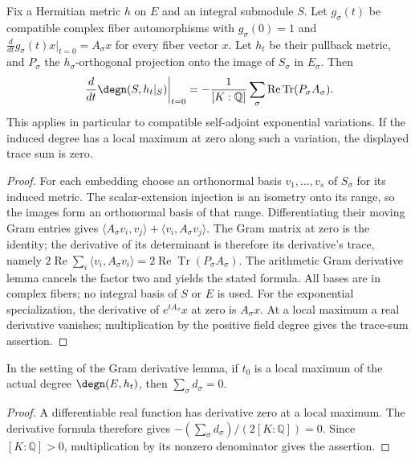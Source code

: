 \begin{lemma}
\label{lem:submodule-projection-trace-derivative}
\leanok
Fix a Hermitian metric $h$ on $E$ and an integral submodule $S$.
Let $g_\sigma(t)$ be compatible complex fiber automorphisms with
$g_\sigma(0)=1$ and
$\frac{d}{dt}g_\sigma(t)x|_{t=0}=A_\sigma x$ for every fiber vector $x$.
Let $h_t$ be their pullback metric, and $P_\sigma$ the $h_\sigma$-orthogonal
projection onto the image of $S_\sigma$ in $E_\sigma$. Then
\[
 \left.\frac{d}{dt}\degn(S,h_t|_S)\right|_{t=0}
 =-\frac1{[K:\mathbb Q]}\sum_\sigma
   \operatorname{Re}\operatorname{Tr}(P_\sigma A_\sigma).
\]
This applies in particular to compatible self-adjoint exponential
variations. If the induced degree has a local maximum at zero along
such a variation, the displayed trace sum is zero.
\end{lemma}
\begin{proof}
For each embedding choose an orthonormal basis $v_1,\ldots,v_s$ of
$S_\sigma$ for its induced metric. The scalar-extension injection
is an isometry onto its range, so the images form an orthonormal basis
of that range. Differentiating their moving Gram entries gives
$\langle A_\sigma v_i,v_j\rangle+\langle v_i,A_\sigma v_j\rangle$.
The Gram matrix at zero is the identity; the derivative of its
determinant is therefore its derivative's trace, namely
$2\operatorname{Re}\sum_i\langle v_i,A_\sigma v_i\rangle
=2\operatorname{Re}\operatorname{Tr}(P_\sigma A_\sigma)$.
The arithmetic Gram derivative lemma cancels the factor two and yields
the stated formula. All bases are in complex fibers; no integral basis
of $S$ or $E$ is used.
For the exponential specialization, the derivative of $e^{tA_\sigma}x$
at zero is $A_\sigma x$. At a local maximum a real derivative vanishes;
multiplication by the positive field degree gives the trace-sum assertion.
\end{proof}

\begin{lemma}
\label{lem:arithmetic-degree-stationarity}
\leanok
In the setting of the Gram derivative lemma, if $t_0$ is a local maximum
of the actual degree $\degn(E,h_t)$, then $\sum_\sigma d_\sigma=0$.
\end{lemma}
\begin{proof}
A differentiable real function has derivative zero at a local maximum.
The derivative formula therefore gives
$-(\sum_\sigma d_\sigma)/(2[K:\mathbb Q])=0$.
Since $[K:\mathbb Q]>0$, multiplication by its nonzero denominator
gives the assertion.
\end{proof}


